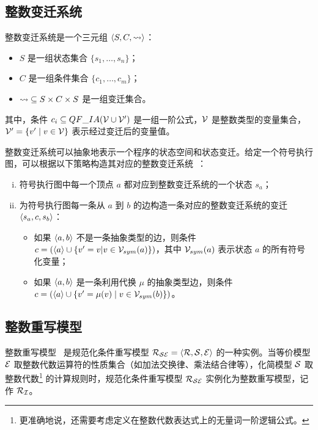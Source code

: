 \subsection{整数变迁系统}
\label{ss:ITS}

\begin{definition}
整数变迁系统是一个三元组 $\langle S, C, \rightsquigarrow \rangle$：
\begin{itemize}
\item $S$ 是一组状态集合 $\{s_1,\ldots,s_n\}$；
\item $C$ 是一组条件集合 $\{c_1,\ldots,c_m\}$；
\item ${\rightsquigarrow} \subseteq S \times C \times S$ 是一组变迁集合。
\end{itemize}
其中，条件 $c_i \subseteq QF\_IA(\mathcal{V}\cup\mathcal{V}')$ 是一组一阶公式，$\mathcal{V}$ 是整数类型的变量集合，$\mathcal{V}' = \{v' \mid v\in\mathcal{V} \}$ 表示经过变迁后的变量值。
\end{definition}

整数变迁系统可以抽象地表示一个程序的状态空间和状态变迁。给定一个符号执行图，可以根据以下策略构造其对应的整数变迁系统~\cite{DBLP:journals/jar/StroderGBFFHSA17}：
\begin{enumerate} [(i)]
\item 符号执行图中每一个顶点 $a$ 都对应到整数变迁系统的一个状态 $s_a$；
\item 为符号执行图每一条从 $a$ 到 $b$ 的边构造一条对应的整数变迁系统的变迁 $\langle s_a, c, s_b\rangle$：
\begin{itemize}
\item 如果 $\langle a, b\rangle$ 不是一条抽象类型的边，则条件 $c = (\langle a\rangle \cup \{v' = v | v\in\mathcal{V}_{sym}(a)\})$，其中 $\mathcal{V}_{sym}(a)$ 表示状态 $a$ 的所有符号化变量；
\item 如果 $\langle a, b\rangle$ 是一条利用代换 $\mu$ 的抽象类型边，则条件 $c = (\langle a\rangle \cup \{v'=\mu(v) \mid v\in\mathcal{V}_{sym}(b)\})$。
\end{itemize}
\end{enumerate}

\subsection{整数重写模型}
\label{ss:intTRS}
整数重写模型~\cite{DBLP:conf/rta/FalkeKS11} 是规范化条件重写模型 $\mathcal{R}_{\mathcal{S}\mathcal{E}} = \langle \mathcal{R},\mathcal{S},\mathcal{E} \rangle$ 的一种实例。当等价模型 $\mathcal{E}$ 取整数代数运算符的性质集合（如加法交换律、乘法结合律等），化简模型 $\mathcal{S}$ 取整数代数\footnote{更准确地说，还需要考虑定义在整数代数表达式上的无量词一阶逻辑公式。} 的计算规则时，规范化条件重写模型 $\mathcal{R}_{\mathcal{S}\mathcal{E}}$ 实例化为整数重写模型，记作 $\mathcal{R}_{\mathcal{I}}$。

